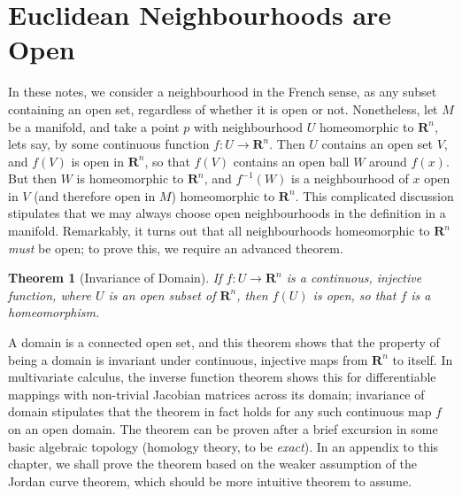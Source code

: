 \documentclass[12pt]{report}
\theoremstyle{plain}
\newtheorem{theorem}{Theorem}[chapter]
\theoremstyle{definition}
\begin{document}
\section{Euclidean Neighbourhoods are Open}

In these notes, we consider a neighbourhood in the French sense, as any subset containing an open set, regardless of whether it is open or not. Nonetheless, let $M$ be a manifold, and take a point $p$ with neighbourhood $U$ homeomorphic to $\mathbf{R}^n$, lets say, by some continuous function $f: U \to \mathbf{R}^n$. Then $U$ contains an open set $V$, and $f(V)$ is open in $\mathbf{R}^n$, so that $f(V)$ contains an open ball $W$ around $f(x)$. But then $W$ is homeomorphic to $\mathbf{R}^n$, and $f^{-1}(W)$ is a neighbourhood of $x$ open in $V$ (and therefore open in $M$) homeomorphic to $\mathbf{R}^n$. This complicated discussion stipulates that we may always choose open neighbourhoods in the definition in a manifold. Remarkably, it turns out that all neighbourhoods homeomorphic to $\mathbf{R}^n$ {\it must} be open; to prove this, we require an advanced theorem.


\begin{theorem}[Invariance of Domain]
    If $f:U \to \mathbf{R}^n$ is a continuous, injective function, where $U$ is an open subset of $\mathbf{R}^n$, then $f(U)$ is open, so that $f$ is a homeomorphism.
\end{theorem}

A domain is a connected open set, and this theorem shows that the property of being a domain is invariant under continuous, injective maps from $\mathbf{R}^n$ to itself. In multivariate calculus, the inverse function theorem shows this for differentiable mappings with non-trivial Jacobian matrices across its domain; invariance of domain stipulates that the theorem in fact holds for any such continuous map $f$ on an open domain. The theorem can be proven after a brief excursion in some basic algebraic topology (homology theory, to be {\it exact}). In an appendix to this chapter, we shall prove the theorem based on the weaker assumption of the Jordan curve theorem, which should be more intuitive theorem to assume.
\end{document}
